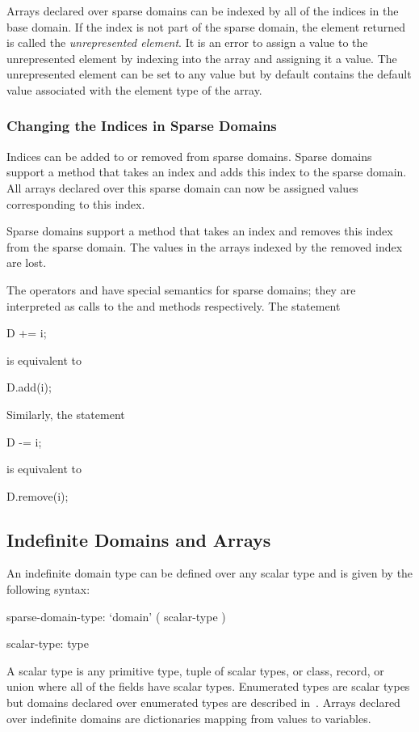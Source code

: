 Arrays declared over sparse domains can be indexed by all of the
indices in the base domain.  If the index is not part of the sparse
domain, the element returned is called the {\em unrepresented
element}.  It is an error to assign a value to the unrepresented
element by indexing into the array and assigning it a value.  The
unrepresented element can be set to any value but by default contains
the default value associated with the element type of the array.

\subsubsection{Changing the Indices in Sparse Domains}

Indices can be added to or removed from sparse domains.  Sparse
domains support a method  that takes an index and adds this
index to the sparse domain.  All arrays declared over this sparse
domain can now be assigned values corresponding to this index.

Sparse domains support a method  that takes an index and
removes this index from the sparse domain.  The values in the arrays
indexed by the removed index are lost.

The operators \chpl{+=} and \chpl{-=} have special semantics for
sparse domains; they are interpreted as calls to the 
and  methods respectively.  The statement
\begin{chapel}
D += i;
\end{chapel}
is equivalent to
\begin{chapel}
D.add(i);
\end{chapel}
Similarly, the statement
\begin{chapel}
D -= i;
\end{chapel}
is equivalent to
\begin{chapel}
D.remove(i);
\end{chapel}

\subsection{Indefinite Domains and Arrays}
\label{Indefinite_Domains_and_Arrays}

An indefinite domain type can be defined over any scalar type and is
given by the following syntax:
\begin{syntax}
sparse-domain-type:
  `domain' ( scalar-type )

scalar-type:
  type
\end{syntax}
A scalar type is any primitive type, tuple of scalar types, or class,
record, or union where all of the fields have scalar types.
Enumerated types are scalar types but domains declared over enumerated
types are described in~.  Arrays
declared over indefinite domains are dictionaries mapping from values
to variables.

